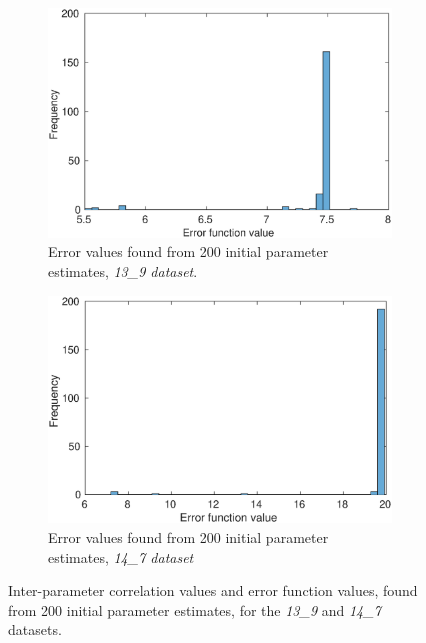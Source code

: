 \documentclass[10pt,journal]{./IEEE_latex_class/IEEEtran}
\begin{document}
\begin{figure}[H]
       \begin{subfigure}[c]{0.49\textwidth}
        \centering
    \includegraphics[scale = 0.35, clip = true, trim = 0 0 0 0]{13_9_f_hist}
        \caption{Error values found from 200 initial parameter estimates, \textit{13\_9 dataset}. }
        \label{InitialResults_13_9_f}
    \end{subfigure}
    \begin{subfigure}[c]{0.49\textwidth}
    \centering
        \includegraphics[scale = 0.35, clip = true, trim = 0 0 0 0]{14_7_f_hist}
        \caption{Error values found from 200 initial parameter estimates, \textit{14\_7 dataset}}
        \label{InitialResults_14_7_f}
    \end{subfigure}
    \caption{Inter-parameter correlation values and error function values, found from 200 initial parameter estimates, for the \textit{13\_9} and \textit{14\_7} datasets.}     
\label{InitialResults_additional}
\end{figure}
\end{document}
